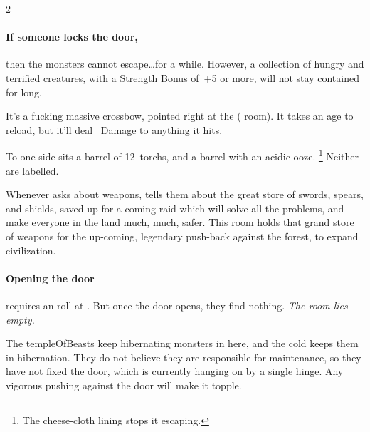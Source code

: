 \begin{multicols}{2}

\paragraph{If someone locks the door,}
then the \glspl{monster} cannot escape\ldots for a while.
However, a collection of hungry and terrified creatures, with a Strength Bonus of~+5 or more, will not stay contained for long.


It's a fucking massive crossbow, pointed right at the  ( room).
It takes an age to reload, but it'll deal ~Damage to anything it hits.

To one side sits a barrel of 12~\glspl{torch}, and a barrel with an acidic ooze.%
\footnote{The cheese-cloth lining stops it escaping.}
Neither are labelled.

\jelly


\begin{exampletext}
  Whenever  asks about \glspl{weapon},  tells them about the great store of swords, spears, and shields, saved up for a coming raid which will solve all the problems, and make everyone in the land much, much, safer.
  This room holds that grand store of weapons for the up-coming, legendary push-back against the forest, to expand civilization.
\end{exampletext}

\paragraph{Opening the door}
requires an  roll at \tn[12].
But once the door opens, they find nothing.
\emph{The room lies empty.}


The \gls{templeOfBeasts} keep hibernating \glspl{monster} in here, and the cold keeps them in hibernation.
They do not believe they are responsible for maintenance, so they have not fixed the door, which is currently hanging on by a single hinge.
Any vigorous pushing against the door will make it topple.


\end{multicols}
